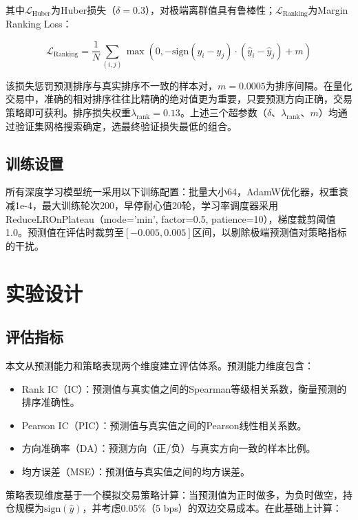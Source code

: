 \documentclass[12pt,a4paper]{ctexart}
\begin{document}
其中$\mathcal{L}_{\text{Huber}}$为Huber损失（$\delta=0.3$），对极端离群值具有鲁棒性；$\mathcal{L}_{\text{Ranking}}$为Margin Ranking Loss：

\begin{equation}
\mathcal{L}_{\text{Ranking}} = \frac{1}{N}\sum_{(i,j)} \max\left(0, -\text{sign}(y_i - y_j) \cdot (\hat{y}_i - \hat{y}_j) + m\right)
\end{equation}

该损失惩罚预测排序与真实排序不一致的样本对，$m=0.0005$为排序间隔。在量化交易中，准确的相对排序往往比精确的绝对值更为重要，只要预测方向正确，交易策略即可获利。排序损失权重$\lambda_{\text{rank}}=0.13$。上述三个超参数（$\delta$、$\lambda_{\text{rank}}$、$m$）均通过验证集网格搜索确定，选最终验证损失最低的组合。

\subsection{训练设置}

所有深度学习模型统一采用以下训练配置：批量大小64，AdamW优化器，权重衰减1e-4，最大训练轮次200，早停耐心值20轮，学习率调度器采用ReduceLROnPlateau（mode='min', factor=0.5, patience=10），梯度裁剪阈值1.0。预测值在评估时裁剪至$[-0.005, 0.005]$区间，以剔除极端预测值对策略指标的干扰。

\section{实验设计}

\subsection{评估指标}

本文从预测能力和策略表现两个维度建立评估体系。预测能力维度包含：

\begin{itemize}[leftmargin=2.5em]
    \item Rank IC（IC）：预测值与真实值之间的Spearman等级相关系数，衡量预测的排序准确性。
    \item Pearson IC（PIC）：预测值与真实值之间的Pearson线性相关系数。
    \item 方向准确率（DA）：预测方向（正/负）与真实方向一致的样本比例。
    \item 均方误差（MSE）：预测值与真实值之间的均方误差。
\end{itemize}

策略表现维度基于一个模拟交易策略计算：当预测值为正时做多，为负时做空，持仓规模为$\text{sign}(\hat{y})$，并考虑0.05\%（5 bps）的双边交易成本。在此基础上计算：
\end{document}
